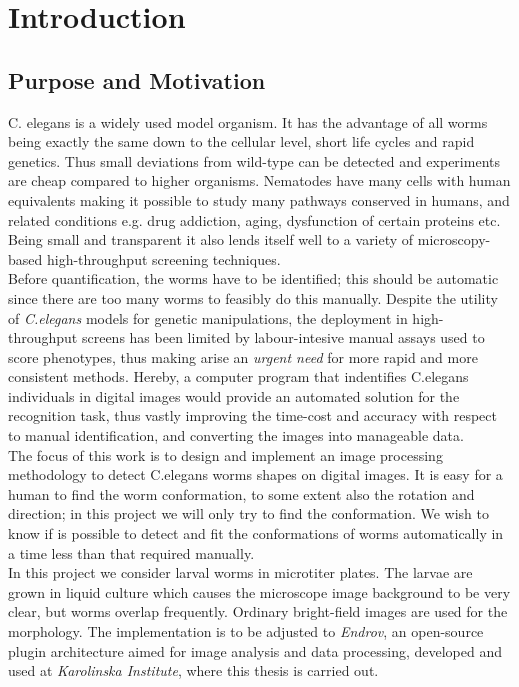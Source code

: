 \cleardoublepage
\thispagestyle{empty}
\chapter{Introduction}

\section{Purpose and Motivation}
\label{sec:motivation}

C. elegans is a widely used model organism. It has the advantage of all worms 
being exactly the same down to the cellular level, short life cycles and rapid
 genetics. Thus small deviations from wild-type can be detected and experiments
 are cheap compared to higher organisms. Nematodes have many cells with human
 equivalents making it possible to study many pathways conserved in humans, 
and related conditions e.g. drug addiction, aging, dysfunction of certain
 proteins etc. Being small and transparent it also lends itself well to a 
variety of microscopy-based high-throughput screening techniques.\\
 
Before quantification, the worms have to be identified; this should be 
automatic since there are too many worms to feasibly do this manually.
Despite the utility of \emph{C.elegans} models for genetic 
manipulations, the deployment in high-throughput screens has been limited by 
labour-intesive manual assays used to score phenotypes, thus making arise
an \emph{urgent need} for more rapid and more consistent methods.
Hereby, a computer
program that indentifies C.elegans individuals in digital images would 
provide an automated solution for the recognition task, thus vastly 
improving the time-cost and accuracy with respect to manual identification, 
and converting the images into manageable data.\\

The focus of this work is to design and implement an image processing
methodology to detect C.elegans worms shapes on digital images.
It is easy for a human to find the worm conformation,
to some extent also the rotation and direction; in this project we will only 
try to find the conformation. We wish to know if is possible to detect and fit
the conformations of worms automatically in a time less than that required manually.\\

In this project we consider larval worms in microtiter plates. The larvae are 
grown in liquid culture which causes the microscope image background to be 
very clear, but worms overlap frequently. Ordinary bright-field images are 
used for the morphology. The implementation is to be adjusted to \emph{Endrov},
an open-source plugin architecture aimed for image analysis and data processing,
developed and used at \emph{Karolinska Institute}, where this thesis is 
carried out.

